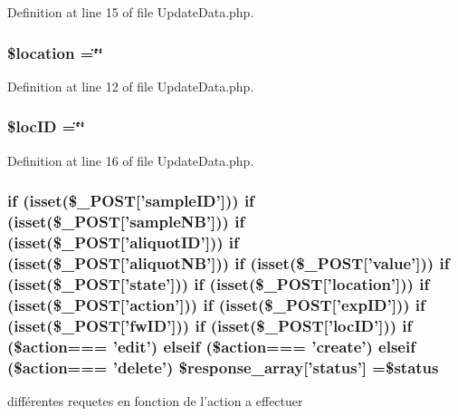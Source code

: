 Definition at line 15 of file Update\-Data.\-php.

\hypertarget{_update_data_8php_ac319193077976bb217112e5a7b7b8022}{
\subsubsection[{\$location}]{\setlength{\rightskip}{0pt plus 5cm}\$location =\char`\"{}\char`\"{}}}\label{_update_data_8php_ac319193077976bb217112e5a7b7b8022}


Definition at line 12 of file Update\-Data.\-php.

\hypertarget{_update_data_8php_a300bbb59b771f6b6700da34d749d93e7}{
\subsubsection[{\$loc\-I\-D}]{\setlength{\rightskip}{0pt plus 5cm}\$loc\-I\-D =\char`\"{}\char`\"{}}}\label{_update_data_8php_a300bbb59b771f6b6700da34d749d93e7}


Definition at line 16 of file Update\-Data.\-php.

\hypertarget{_update_data_8php_adaa42b6993796ea8225ce000539856d9}{
\subsubsection[{\$response\-\_\-array}]{\setlength{\rightskip}{0pt plus 5cm}if (isset(\$\-\_\-\-P\-O\-S\-T\mbox{[}'sample\-I\-D'\mbox{]})) if (isset(\$\-\_\-\-P\-O\-S\-T\mbox{[}'sample\-N\-B'\mbox{]})) if (isset(\$\-\_\-\-P\-O\-S\-T\mbox{[}'aliquot\-I\-D'\mbox{]})) if (isset(\$\-\_\-\-P\-O\-S\-T\mbox{[}'aliquot\-N\-B'\mbox{]})) if (isset(\$\-\_\-\-P\-O\-S\-T\mbox{[}'value'\mbox{]})) if (isset(\$\-\_\-\-P\-O\-S\-T\mbox{[}'state'\mbox{]})) if (isset(\$\-\_\-\-P\-O\-S\-T\mbox{[}'location'\mbox{]})) if (isset(\$\-\_\-\-P\-O\-S\-T\mbox{[}'action'\mbox{]})) if (isset(\$\-\_\-\-P\-O\-S\-T\mbox{[}'{\bf exp\-I\-D}'\mbox{]})) if (isset(\$\-\_\-\-P\-O\-S\-T\mbox{[}'fw\-I\-D'\mbox{]})) if (isset(\$\-\_\-\-P\-O\-S\-T\mbox{[}'loc\-I\-D'\mbox{]})) if (\$action=== 'edit') elseif (\$action=== 'create') elseif (\$action=== 'delete') \$response\-\_\-array\mbox{[}'status'\mbox{]} =\$status}}\label{_update_data_8php_adaa42b6993796ea8225ce000539856d9}
différentes requetes en fonction de l'action a effectuer 


